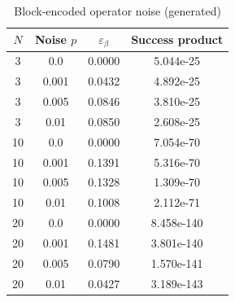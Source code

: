 \begin{table}[h]
\small
\centering
\caption{Block-encoded operator noise (generated)}
\label{tab:noise_large}
\begin{tabular}{cccc}
\hline
$N$&Noise $p$&$\varepsilon_\beta$&Success product\\
\hline
3&0.0&0.0000&5.044e-25\\
3&0.001&0.0432&4.892e-25\\
3&0.005&0.0846&3.810e-25\\
3&0.01&0.0850&2.608e-25\\
10&0.0&0.0000&7.054e-70\\
10&0.001&0.1391&5.316e-70\\
10&0.005&0.1328&1.309e-70\\
10&0.01&0.1008&2.112e-71\\
20&0.0&0.0000&8.458e-140\\
20&0.001&0.1481&3.801e-140\\
20&0.005&0.0790&1.570e-141\\
20&0.01&0.0427&3.189e-143\\
\hline
\end{tabular}
\end{table}
